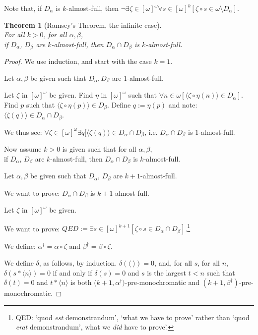 \documentclass[a4paper]{amsart}
\theoremstyle{plain}
\newtheorem{theorem}{Theorem}
\begin{document}
Note that, if $D_\alpha$ is $k$-almost-full, then $\neg\exists \zeta\in[\omega]^\omega\forall s \in [\omega]^k[\zeta\circ s \in \omega\setminus D_\alpha]$. 

\begin{theorem}[Ramsey's Theorem, the infinite case]\label{T:ramsey}$\;$\\
For all $k>0$,  for all $\alpha, \beta$, \\if $D_\alpha$, $D_\beta$ are $k$-almost-full, then $D_\alpha\cap D_\beta$ is $k$-almost-full. \end{theorem}

\begin{proof} We use induction, and start with the case $k=1$.

Let $\alpha, \beta$ be given such that $D_\alpha, D_\beta$ are $1$-almost-full.

Let $\zeta$ in $[\omega]^\omega$ be given. Find $\eta$ in $[\omega]^\omega$ such that $\forall n \in \omega[\langle\zeta\circ\eta(n)\rangle\in D_\alpha]$. Find $p$ such that $\langle \zeta\circ\eta(p)\rangle \in D_\beta$. Define $q:=\eta(p)$ and note: $\langle \zeta(q)\rangle \in D_\alpha\cap D_\beta$.

We thus see:  $\forall \zeta \in [\omega]^\omega\exists q[\langle \zeta(q)\rangle \in D_\alpha\cap D_\beta$, i.e. $D_\alpha\cap D_\beta$ is $1$-almost-full. 

\smallskip Now assume $k>0$ is given such that   for all $\alpha, \beta$, \\if $D_\alpha$, $D_\beta$ are $k$-almost-full, then $D_\alpha\cap D_\beta$ is $k$-almost-full.

 Let $\alpha, \beta$ be given such that $D_\alpha$, $D_\beta$ are $k+1$-almost-full.
 
 We want to prove: $D_\alpha\cap D_\beta$ is $k+1$-almost-full.
 
 Let $\zeta$ in $[\omega]^\omega$ be given.
 
 We want to prove: $QED:=\exists s\in [\omega]^{k+1}[\zeta \circ s \in D_\alpha\cap D_\beta]$.\footnote{QED: `quod \emph{est} demonstrandum', `what we have to prove' rather than `quod \emph{erat} demonstrandum', what we \emph{did} have to prove'.} 
 
 
 \smallskip
 We define: $\alpha^\dag = \alpha\circ\zeta$ and $\beta^\dag=\beta\circ \zeta$.
 
 
 We  define $\delta$, as follows, by induction.  $\delta(\langle\;\rangle)=0$, and, for all $s$, for all $n$, $\delta(s\ast\langle n \rangle)=0$ if and only if $\delta(s)=0$ and $s$ is the largest $t<n$ such that $\delta(t)=0$ and $t\ast\langle n \rangle$ is both ($k+1,\alpha^\dag)$-pre-monochromatic and  $(k+1,\beta^\dag)$-pre-monochromatic.


\end{proof}
\end{document}
